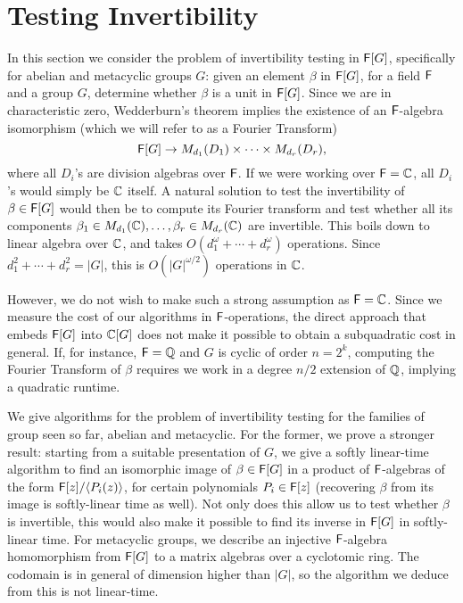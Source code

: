 \section{Testing Invertibility}
\label{sec:invertibility}

In this section we consider the problem of invertibility testing in
${\mathsf{F}}[G]$, specifically for abelian and metacyclic groups $G$: given an
element $\beta$ in ${\mathsf{F}}[G]$, for a field ${\mathsf{F}}$ and a group $G$, determine
whether $\beta$ is a unit in ${\mathsf{F}}[G]$.  
Since we are in characteristic zero, Wedderburn's theorem implies the
existence of an ${\mathsf{F}}$-algebra isomorphism (which we will refer to as a
Fourier Transform)
\[
  {\mathsf{F}}[G] \to M_{d_1}(D_1) \times \dots \times M_{d_r}(D_r),
\]
where all $D_i$'s are division algebras over ${\mathsf{F}}$. If we were working over
${\mathsf{F}}=\mathbb{C}$, all $D_i$'s would simply be $\mathbb{C}$ itself.  A natural solution
to test the invertibility of $\beta \in {\mathsf{F}}[G]$ would then be to compute its
Fourier transform and test whether all its components
$\beta_1 \in M_{d_1}(\mathbb{C}),\dots,\beta_r \in M_{d_r}(\mathbb{C})$ are
invertible. This boils down to linear algebra over $\mathbb{C}$, and takes
$O(d_1^\omega + \cdots + d_r^\omega)$ operations.  Since
$d_1^2 + \cdots + d_r^2 = |G|$, this is $O(|G|^{\omega/2})$ operations in
$\mathbb{C}$.

However, we do not wish to make such a strong assumption as ${\mathsf{F}}=\mathbb{C}$. Since
we measure the cost of our algorithms in ${\mathsf{F}}$-operations, the direct
approach that embeds ${\mathsf{F}}[G]$ into $\mathbb{C}[G]$ does not make it possible to
obtain a subquadratic cost in general. If, for instance, ${\mathsf{F}}=\mathbb{Q}$ and $G$ is
cyclic of order $n=2^k$, computing the Fourier Transform of $\beta$
requires we work in a degree $n/2$ extension of $\mathbb{Q}$, implying a quadratic
runtime.

We give algorithms for the problem of invertibility testing for the
families of group seen so far, abelian and metacyclic. For the former,
we prove a stronger result: starting from a suitable presentation of
$G$, we give a softly linear-time algorithm to find an isomorphic
image of $\beta \in {\mathsf{F}}[G]$ in a product of ${\mathsf{F}}$-algebras of the form
${\mathsf{F}}[z]/\langle P_i(z)\rangle$, for certain polynomials $P_i \in {\mathsf{F}}[z]$
(recovering $\beta$ from its image is softly-linear time as well). Not
only does this allow us to test whether $\beta$ is invertible, this
would also make it possible to find its inverse in ${\mathsf{F}}[G]$ in
softly-linear time.  For metacyclic groups, we describe an injective
${\mathsf{F}}$-algebra homomorphism from ${\mathsf{F}}[G]$ to a matrix algebras over a
cyclotomic ring. The codomain is in general of dimension higher than
$|G|$, so the algorithm we deduce from this is not linear-time.

